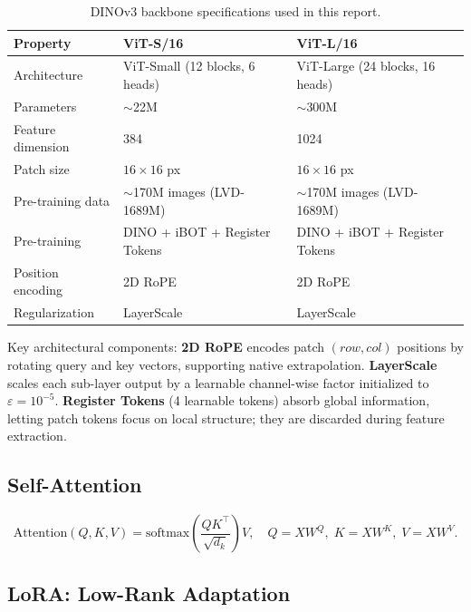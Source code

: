 \documentclass[11pt,a4paper]{article}
\begin{document}
\begin{table}[H]
\centering\small
\caption{DINOv3 backbone specifications used in this report.}
\label{tab:dinov3_params}
\begin{tabular}{@{}lll@{}}
\toprule
\textbf{Property} & \textbf{ViT-S/16} & \textbf{ViT-L/16} \\
\midrule
Architecture       & ViT-Small (12 blocks, 6 heads)  & ViT-Large (24 blocks, 16 heads) \\
Parameters         & $\sim$22M                       & $\sim$300M \\
Feature dimension  & 384                             & 1024 \\
Patch size         & $16\!\times\!16$ px             & $16\!\times\!16$ px \\
Pre-training data  & $\sim$170M images (LVD-1689M)   & $\sim$170M images (LVD-1689M) \\
Pre-training       & DINO + iBOT + Register Tokens   & DINO + iBOT + Register Tokens \\
Position encoding  & 2D RoPE                         & 2D RoPE \\
Regularization     & LayerScale                      & LayerScale \\
\bottomrule
\end{tabular}
\end{table}

Key architectural components: \textbf{2D RoPE} encodes patch $(row, col)$ positions by rotating query
and key vectors, supporting native extrapolation. \textbf{LayerScale} scales each sub-layer output by a
learnable channel-wise factor initialized to $\varepsilon = 10^{-5}$. \textbf{Register Tokens} (4
learnable tokens) absorb global information, letting patch tokens focus on local structure; they are
discarded during feature extraction.

\subsection{Self-Attention}
\begin{equation}
\text{Attention}(Q, K, V) = \text{softmax}\!\left(\frac{QK^\top}{\sqrt{d_k}}\right)V,
\quad Q = XW^Q,\; K = XW^K,\; V = XW^V.
\end{equation}

\subsection{LoRA: Low-Rank Adaptation}
\end{document}
